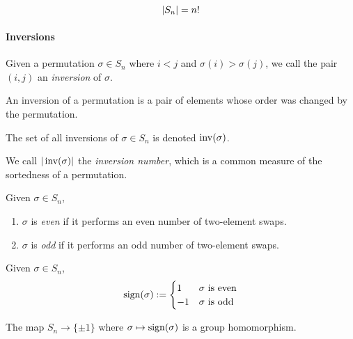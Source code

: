 \begin{proposition}[Order of \(S_n\)]
   \[\left\lvert S_n\right\rvert = n!\]
\end{proposition}

\paragraph{Inversions}
\begin{definition}[Inversion]
   Given a permutation \(\sigma \in S_n\) where \(i < j\) and \(\sigma(i) > \sigma(j)\), we call the pair \((i,j)\) an \emph{inversion} of \(\sigma\).
\end{definition}
\begin{remark}[Intuition]
   An inversion of a permutation is a pair of elements whose order was changed by the permutation.
\end{remark}

\begin{definition}
   The set of all inversions of \(\sigma \in S_n\) is denoted \(\operatorname{inv}(\sigma)\).
\end{definition}
\begin{remark}[Terminology]
   We call \(|\operatorname{inv}(\sigma)|\) the \emph{inversion number}, which is a common measure of the sortedness of a permutation.
\end{remark}

\begin{definition}
   Given \(\sigma \in S_n\),
   \begin{enumerate}[label=\roman*, align=Center]
      \item \(\sigma\) is \emph{even} if it performs an even number of two-element swaps.
      \item \(\sigma\) is \emph{odd} if it performs an odd number of two-element swaps.
   \end{enumerate}
\end{definition}

\begin{definition}
   Given \(\sigma \in S_n\),
   \[\operatorname{sign}(\sigma) := \begin{cases}1 & \sigma~\text{is even}\\ -1 & \sigma~\text{is odd}\end{cases}\]
\end{definition}
\begin{remark}
   The map \(S_n \to \{\pm 1\}\) where \(\sigma \mapsto \operatorname{sign}(\sigma)\) is a group homomorphism.
\end{remark}

